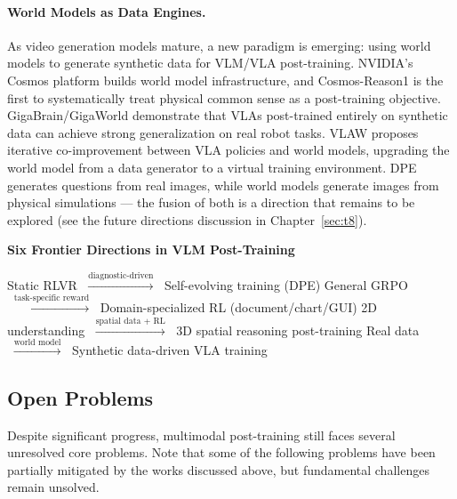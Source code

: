 \paragraph{World Models as Data Engines.}
\label{sec:t5-world-models}
As video generation models mature,
a new paradigm is emerging: using world models to generate synthetic data for VLM/VLA post-training.
NVIDIA's Cosmos platform \cite{agarwal2025cosmoswfm,ali2025cosmospredict25} builds world model infrastructure,
and Cosmos-Reason1 \cite{azzolini2025cosmosreason1} is the first to systematically treat physical common sense as a post-training objective.
GigaBrain/GigaWorld \cite{ye2025gigabrain0,ye2025gigaworld0}
demonstrate that VLAs post-trained entirely on synthetic data can achieve strong generalization on real robot tasks.
VLAW \cite{guo2026vlaw} proposes iterative co-improvement between VLA policies and world models,
upgrading the world model from a data generator to a virtual training environment.
DPE generates questions from real images, while world models generate images from physical simulations ---
the fusion of both is a direction that remains to be explored
(see the future directions discussion in Chapter~\ref{sec:t8}).

\begin{evolutionbox}
\textbf{Six Frontier Directions in VLM Post-Training}

Static RLVR $\;\xrightarrow{\text{diagnostic-driven}}\;$ Self-evolving training (DPE)
\qquad
General GRPO $\;\xrightarrow{\text{task-specific reward}}\;$ Domain-specialized RL (document/chart/GUI)
\qquad
2D understanding $\;\xrightarrow{\text{spatial data + RL}}\;$ 3D spatial reasoning post-training
\qquad
Real data $\;\xrightarrow{\text{world model}}\;$ Synthetic data-driven VLA training
\end{evolutionbox}

\subsection{Open Problems}
\label{sec:t5-open}

Despite significant progress, multimodal post-training still faces several unresolved core problems.
Note that some of the following problems have been partially mitigated by the works discussed above,
but fundamental challenges remain unsolved.

